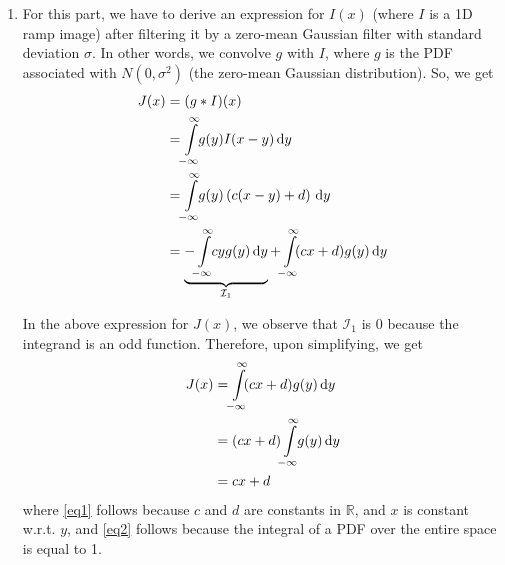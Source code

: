 \documentclass[a4paper]{article}
\newcommand{\R}{\mathbb{R}}
\begin{document}
\begin{enumerate}
\item For this part, we have to derive an expression for $I(x)$ (where $I$ is a 1D ramp image) after filtering it by a zero-mean Gaussian filter with standard deviation $\sigma$. In other words, we convolve $g$ with $I$, where $g$ is the PDF associated with $N(0, \sigma^2)$ (the zero-mean Gaussian distribution). So, we get
\begin{align*}
J(x) &= (g * I)(x) \\
&= \int\limits_{\mathclap{-\infty}}^{\mathclap{\infty}}\! g(y) I (x - y)\, \mathrm{d}y \\
&= \int\limits_{\mathclap{-\infty}}^{\mathclap{\infty}}\! g(y)\left ( c(x - y) + d\right )\, \mathrm{d}y \\
&= \underbrace{-\int\limits_{\mathclap{-\infty}}^{\mathclap{\infty}}\! c y g(y)\, \mathrm{d}y}_{\mathcal{I}_1} + \int\limits_{\mathclap{-\infty}}^{\mathclap{\infty}}\! (cx + d)g(y)\, \mathrm{d}y
\end{align*}

In the above expression for $J(x)$, we observe that $\mathcal{I}_1$ is 0 because the integrand is an odd function. Therefore, upon simplifying, we get
\begin{align}
J(x) &= \int\limits_{\mathclap{-\infty}}^{\mathclap{\infty}}\! (cx + d)g(y)\, \mathrm{d}y \nonumber \\
&=  (cx + d)\int\limits_{\mathclap{-\infty}}^{\mathclap{\infty}}\!g(y)\, \mathrm{d}y \label{eq1} \\
&= cx + d \label{eq2}
\end{align}
where \eqref{eq1} follows because $c$ and $d$ are constants in $\R$, and $x$ is constant w.r.t. $y$, and \eqref{eq2} follows because the integral of a PDF over the entire space is equal to 1.

\end{enumerate}
\end{document}
